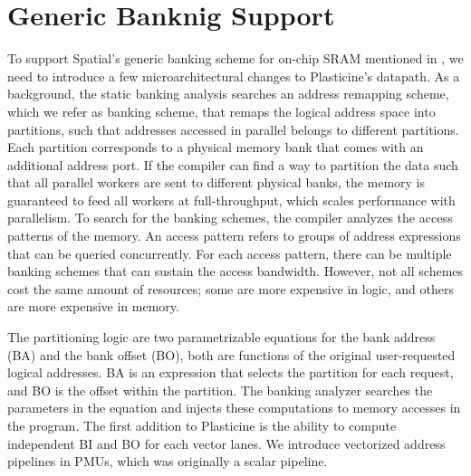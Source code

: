 \section{Generic Banknig Support} \label{sec:banking_arch}

To support Spatial's generic banking scheme for on-chip SRAM mentioned in , 
we need to introduce a few microarchitectural changes to Plasticine's datapath.
As a background, the static banking analysis searches an address remapping scheme, which we refer as
banking scheme, that remaps the logical address space into partitions, such that addresses accessed
in parallel belongs to different partitions. 
Each partition corresponds to a physical memory bank that comes with an additional address port.
If the compiler can find a way to partition the data such that all parallel workers are sent to
different physical banks, the memory is guaranteed to feed all workers at full-throughput, which
scales performance with parallelism.
To search for the banking schemes, the compiler analyzes the access patterns of the memory.
An access pattern refers to groups of address expressions that can be queried concurrently.
For each access pattern, there can be multiple banking schemes that can sustain the access bandwidth.
However, not all schemes cost the same amount of resources; some are more expensive in logic, and
others are more expensive in memory.

The partitioning logic are two parametrizable equations for the bank address (BA) and the bank offset (BO),
both are functions of the original user-requested logical addresses.
BA is an expression that selects the partition for each request, and BO is the offset within the partition.
The banking analyzer searches the parameters in the equation and injects these computations to
memory accesses in the program. 
The first addition to Plasticine is the ability to compute independent BI and BO for each vector
lanes. 
We introduce vectorized address pipelines in PMUs, which was originally a scalar pipeline.

